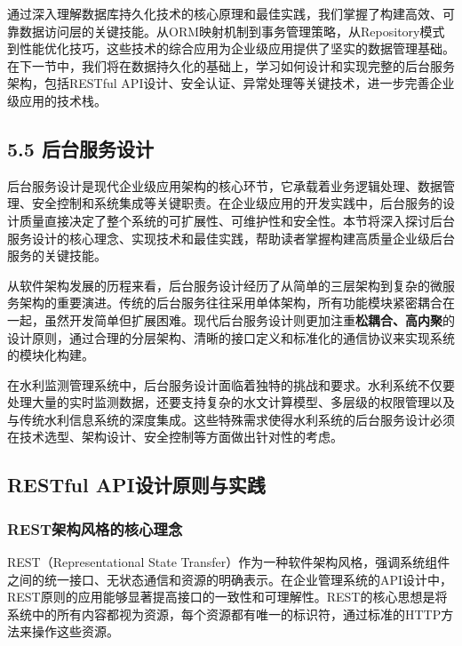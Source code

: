 通过深入理解数据库持久化技术的核心原理和最佳实践，我们掌握了构建高效、可靠数据访问层的关键技能。从ORM映射机制到事务管理策略，从Repository模式到性能优化技巧，这些技术的综合应用为企业级应用提供了坚实的数据管理基础。在下一节中，我们将在数据持久化的基础上，学习如何设计和实现完整的后台服务架构，包括RESTful API设计、安全认证、异常处理等关键技术，进一步完善企业级应用的技术栈。

\subsection{5.5 后台服务设计}\label{ux540eux53f0ux670dux52a1ux8bbeux8ba1}

后台服务设计是现代企业级应用架构的核心环节，它承载着业务逻辑处理、数据管理、安全控制和系统集成等关键职责。在企业级应用的开发实践中，后台服务的设计质量直接决定了整个系统的可扩展性、可维护性和安全性。本节将深入探讨后台服务设计的核心理念、实现技术和最佳实践，帮助读者掌握构建高质量企业级后台服务的关键技能。

从软件架构发展的历程来看，后台服务设计经历了从简单的三层架构到复杂的微服务架构的重要演进。传统的后台服务往往采用单体架构，所有功能模块紧密耦合在一起，虽然开发简单但扩展困难。现代后台服务设计则更加注重\textbf{松耦合、高内聚}的设计原则，通过合理的分层架构、清晰的接口定义和标准化的通信协议来实现系统的模块化构建。

在水利监测管理系统中，后台服务设计面临着独特的挑战和要求。水利系统不仅要处理大量的实时监测数据，还要支持复杂的水文计算模型、多层级的权限管理以及与传统水利信息系统的深度集成。这些特殊需求使得水利系统的后台服务设计必须在技术选型、架构设计、安全控制等方面做出针对性的考虑。

\subsection{RESTful API设计原则与实践}\label{restful-apiux8bbeux8ba1ux539fux5219ux4e0eux5b9eux8df5}

\subsubsection{REST架构风格的核心理念}\label{restux67b6ux6784ux98ceux683cux7684ux6838ux5fc3ux7406ux5ff5}

REST（Representational State Transfer）作为一种软件架构风格，强调系统组件之间的统一接口、无状态通信和资源的明确表示。在企业管理系统的API设计中，REST原则的应用能够显著提高接口的一致性和可理解性。REST的核心思想是将系统中的所有内容都视为资源，每个资源都有唯一的标识符，通过标准的HTTP方法来操作这些资源。

